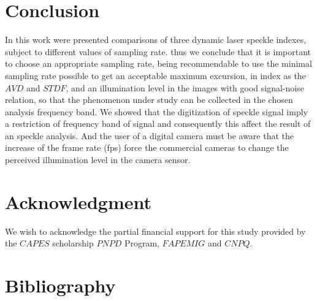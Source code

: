 \documentclass[review]{elsarticle}
\begin{document}
\section{Conclusion} 

In this work were presented comparisons of three dynamic laser speckle indexes,
subject to different values of sampling rate.
thus we conclude that it is important to choose an appropriate sampling rate, 
being recommendable to use the minimal sampling rate possible to get an acceptable maximum excursion, 
in index as the $AVD$ and $STDF$,
and an illumination level in the images with good signal-noise relation,
so that the phenomenon under study can be collected in the chosen analysis frequency band.
We showed that the digitization  of speckle signal imply a restriction of frequency 
band of signal and consequently this affect the result of an speckle analysis.
And the user of a digital camera must be aware that the increase of the frame rate (fps) 
force the commercial cameras to change the perceived illumination level in the camera sensor.

\section{Acknowledgment}
We wish to acknowledge the partial financial support for this study provided by the $CAPES$ 
scholarship
$PNPD$ Program, $FAPEMIG$ and $CNPQ$.


\section{Bibliography}
\end{document}

